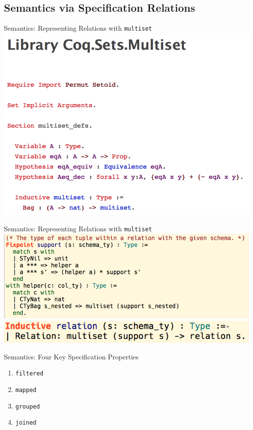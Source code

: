 \subsection{Semantics via Specification Relations}

\begin{frame}{Semantics: Representing Relations with \texttt{multiset}}
\centering
  \includegraphics[scale=0.5]{CoqIDE/Semantics/Multisets.png}
\end{frame}

\begin{frame}{Semantics: Representing Relations with \texttt{multiset}}
\centering
  \includegraphics[scale=0.55]{CoqIDE/Semantics/support.png}
	\\[3ex]
  \includegraphics[scale=0.55]{CoqIDE/Semantics/relation.png}
\end{frame}

\begin{frame}{Semantics: Four Key Specification Properties}
\centering
  \begin{enumerate}
  \item \texttt{filtered}
	\item \texttt{mapped}
	\item \texttt{grouped}
	\item \texttt{joined}
  \end{enumerate}
\end{frame}

